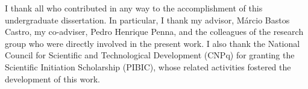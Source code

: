 
\begin{agradecimentos}
	I thank all who contributed in any way to the accomplishment of this
	undergraduate dissertation. In particular, I thank my advisor,
	Márcio Bastos Castro, my co-adviser, Pedro Henrique Penna, and the
	colleagues of the research group who were directly involved in the
	present work. I also thank the National Council for Scientific and
	Technological Development (CNPq) for granting the Scientific Initiation
	Scholarship (PIBIC), whose related activities fostered the development
	of this work.
\end{agradecimentos}

